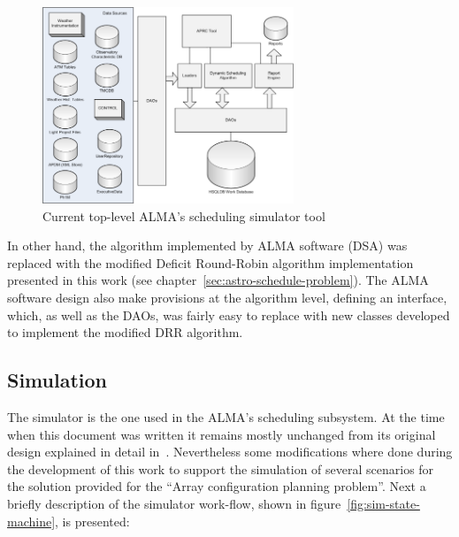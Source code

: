 \begin{figure}[h!]	
\begin{center}
\includegraphics[width=0.67\textwidth]{images/simulator-arch}
\end{center}
\caption{Current top-level ALMA's scheduling simulator tool}
\label{fig:sim-top-level-architecture}
\end{figure}

In other hand, the algorithm implemented by ALMA software (DSA) was replaced with the modified Deficit Round-Robin algorithm implementation presented in this work (see chapter~\ref{sec:astro-schedule-problem}). The ALMA software design also make provisions at the algorithm level, defining an interface, which, as well as the DAOs, was fairly easy to replace with new classes developed to implement the modified DRR algorithm.

\subsection {Simulation}
The simulator is the one used in the ALMA's scheduling subsystem. At the time when this document was written it remains mostly unchanged from its original design explained in detail in~\cite{hoffstadt10}. Nevertheless some modifications where done during the development of this work to support the simulation of several scenarios for the solution provided for the ``Array configuration planning problem''. Next a briefly description of the simulator work-flow, shown in figure~\ref{fig:sim-state-machine}, is presented:

